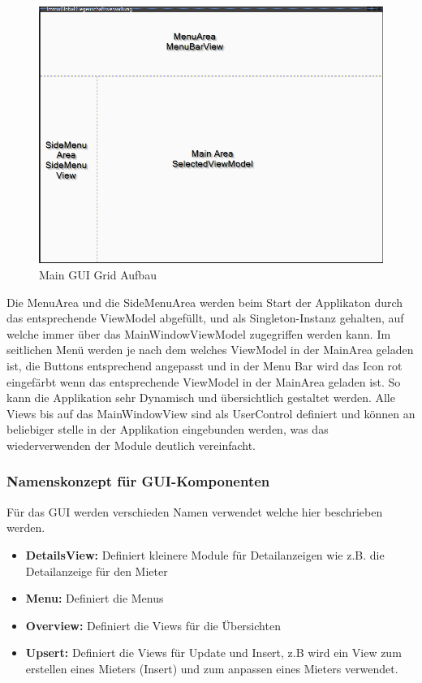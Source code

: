 \begin{figure}[H]
  \begin{center}
    \includegraphics[width=0.6\linewidth]{content/images/MainGuiGrid.png}
    \caption{Main GUI Grid Aufbau}
    \label{guiGrid}
  \end{center}
\end{figure}
Die MenuArea und die SideMenuArea werden beim Start der Applikaton durch das entsprechende ViewModel abgefüllt, und als Singleton-Instanz gehalten, auf welche immer über das MainWindowViewModel zugegriffen werden kann. Im seitlichen Menü werden je nach dem welches ViewModel in der MainArea geladen ist, die Buttons entsprechend angepasst und in der Menu Bar wird das Icon rot eingefärbt wenn das entsprechende ViewModel in der MainArea geladen ist. So kann die Applikation sehr Dynamisch und übersichtlich gestaltet werden.
Alle Views bis auf das MainWindowView sind als UserControl definiert und können an beliebiger stelle in der Applikation eingebunden werden, was das wiederverwenden der Module deutlich vereinfacht.

\subsubsection{Namenskonzept für GUI-Komponenten}
Für das GUI werden verschieden Namen verwendet welche hier beschrieben werden.
\begin{itemize}
  \item \textbf{DetailsView:} Definiert kleinere Module für Detailanzeigen wie z.B. die Detailanzeige für den Mieter
  \item \textbf{Menu:} Definiert die Menus
  \item \textbf{Overview:} Definiert die Views für die Übersichten
  \item \textbf{Upsert:} Definiert die Views für Update und Insert, z.B wird ein View zum erstellen eines Mieters (Insert) und zum anpassen eines Mieters verwendet.
\end{itemize}

